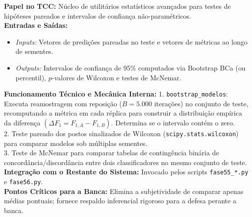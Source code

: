 \documentclass[10pt,a4paper]{article}
\begin{document}
\begin{filebox}
\textbf{Papel no TCC:} Núcleo de utilitários estatísticos avançados para testes de hipóteses pareados e intervalos de confiança não-paramétricos.\\
\textbf{Entradas e Saídas:}
\begin{itemize}[leftmargin=*,itemsep=1pt]
  \item \textit{Inputs:} Vetores de predições pareadas no teste e vetores de métricas ao longo de sementes.
  \item \textit{Outputs:} Intervalos de confiança de 95\% computados via Bootstrap BCa (ou percentil), $p$-valores de Wilcoxon e testes de McNemar.
\end{itemize}
\textbf{Funcionamento Técnico e Mecânica Interna:} 
1. \texttt{bootstrap\_modelos}: Executa reamostragem com reposição ($B=5.000$ iterações) no conjunto de teste, recomputando a métrica em cada réplica para construir a distribuição empírica da diferença $(\Delta F_1 = F_{1,A} - F_{1,B})$. Determina se o intervalo contém o zero.\\
2. Teste pareado dos postos sinalizados de Wilcoxon (\texttt{scipy.stats.wilcoxon}) para comparar modelos sob múltiplas sementes.\\
3. Teste de McNemar para comparar tabelas de contingência binária de concordância/discordância entre dois classificadores no mesmo conjunto de teste.\\
\textbf{Integração com o Restante do Sistema:} Invocado pelos scripts \texttt{fase55\_*.py} e \texttt{fase56.py}.\\
\textbf{Pontos Críticos para a Banca:} Elimina a subjetividade de comparar apenas médias pontuais; fornece respaldo inferencial rigoroso para a defesa perante a banca.
\end{filebox}
\end{document}
